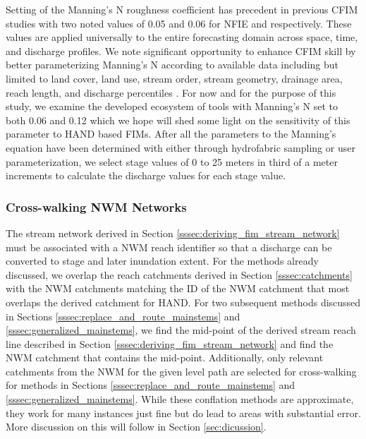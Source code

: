 Setting of the Manning's N roughness coefficient has precedent in previous CFIM studies \cite{maidment2017conceptual,liu2016cybergis,liu2020height,djokic2019arc,garousi2019terrain,zheng2018geoflood} with two noted values of 0.05 and 0.06 for NFIE and  respectively. 
These values are applied universally to the entire forecasting domain across space, time, and discharge profiles.
We note significant opportunity to enhance CFIM skill by better parameterizing Manning's N according to available data including but limited to land cover, land use, stream order, stream geometry, drainage area, reach length, and discharge percentiles \cite{garousi2019terrain,johnson2019integrated}.
For now and for the purpose of this study, we examine the developed ecosystem of tools with Manning's N set to both 0.06 and 0.12 which we hope will shed some light on the sensitivity of this parameter to HAND based FIMs.
After all the parameters to the Manning's equation have been determined with either through hydrofabric sampling or user parameterization, we select stage values of 0 to 25 meters in third of a meter increments to calculate the discharge values for each stage value. 
%
\subsubsection{Cross-walking NWM Networks}
\label{sssec:cross_walking_networks}
%
The stream network derived in Section \ref{sssec:deriving_fim_stream_network} must be associated with a NWM reach identifier so that a discharge can be converted to stage and later inundation extent.
For the methods already discussed, we overlap the reach catchments derived in Section \ref{sssec:catchments} with the NWM catchments matching the ID of the NWM catchment that most overlaps the derived catchment for HAND.
For two subsequent methods discussed in Sections \ref{sssec:replace_and_route_mainstems} and \ref{sssec:generalized_mainstems}, we find the mid-point of the derived stream reach line described in Section \ref{sssec:deriving_fim_stream_network} and find the NWM catchment that contains the mid-point.
Additionally, only relevant catchments from the NWM for the given level path are selected for cross-walking for methods in Sections \ref{sssec:replace_and_route_mainstems} and \ref{sssec:generalized_mainstems}.
While these conflation methods are approximate, they work for many instances just fine but do lead to areas with substantial error. 
More discussion on this will follow in Section \ref{sec:dicussion}.
%
